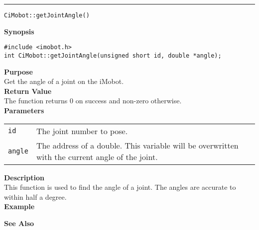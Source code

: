 \noindent
\vspace{5pt}
\rule{6.5in}{0.015in}
\noindent
{\LARGE \texttt{CiMobot::getJointAngle()}}\\
{}

\noindent
{\bf Synopsis}\\
\begin{verbatim}
#include <imobot.h>
int CiMobot::getJointAngle(unsigned short id, double *angle);
\end{verbatim}

\noindent
{\bf Purpose}\\
Get the angle of a joint on the iMobot.\\

\noindent
{\bf Return Value}\\
The function returns 0 on success and non-zero otherwise.\\

\noindent
{\bf Parameters}
\vspace{-0.1in}
\begin{description}
\item               
\begin{tabular}{p{10 mm}p{145 mm}}
\texttt{id} & The joint number to pose. \\
\texttt{angle} & The address of a double. This variable will be overwritten
with the current angle of the joint.
\end{tabular}
\end{description}

\noindent
{\bf Description}\\
This function is used to find the angle of a joint. The angles are accurate to
within half a degree. \\

\noindent
{\bf Example}\\
\noindent

\noindent
{\bf See Also}\\

